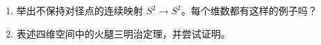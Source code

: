 \begin{enumerate}
\begin{enumerate}[label=(\alph*)]
\item 证明不存在满足条件的 $Y_{2n}\to X_n$。〔提示：自由群之间的同态，若源秩大于目标秩，则核有正秩且为直和分量。选择 $H^1(X_n)$ 的基使 $f^*(\beta_1)=0$，再转为模 $2$ 系数，应用定理 8.8.3 的证明。〕
\item 证明存在满足条件的 $Y_{2n+1}\to X_n$。〔提示：先证 $Y_3\approx T\mathbin{\#}P^2$。〕
\item 证明存在满足条件的 $Y_m\to X_n$，当且仅当 $m\ge2n+1$。
\end{enumerate}
\item 举出不保持对径点的连续映射 $S^2\to S^2$。每个维数都有这样的例子吗？
\item 表述四维空间中的火腿三明治定理，并尝试证明。
\end{enumerate}

